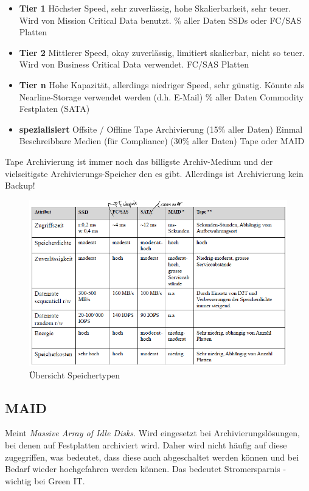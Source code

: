 \begin{itemize}
	\item \textbf{Tier 1}
		\subitem Höchster Speed, sehr zuverlässig, hohe Skalierbarkeit, sehr teuer. Wird von Mission Critical Data benutzt.
		\% aller Daten 
		\subitem SSDs oder FC/SAS Platten
	\item \textbf{Tier 2}
		\subitem Mittlerer Speed, okay zuverlässig, limitiert skalierbar, nicht so teuer. Wird von Business Critical Data verwendet.
		\subitem FC/SAS Platten
	\item \textbf{Tier n}
		\subitem Hohe Kapazität, allerdings niedriger Speed, sehr günstig. Könnte als Nearline-Storage verwendet werden (d.h. E-Mail)
		\% aller Daten
		\subitem Commodity Festplaten (SATA)
	\item \textbf{spezialisiert}
		\subitem Offsite / Offline Tape Archivierung (15\% aller Daten)
		\subitem Einmal Beschreibbare Medien (für Compliance) (30\% aller Daten)
		\subitem Tape oder MAID
\end{itemize}
Tape Archivierung ist immer noch das billigste Archiv-Medium und der vielseitigste Archivierungs-Speicher den es gibt. Allerdings ist Archivierung kein Backup!

\begin{figure}[h!]
	\centering
	\includegraphics[width=0.9\linewidth]{fig/speichertypen}
	\caption{Übersicht Speichertypen}
	\label{fig:speichertypen}
\end{figure}

\subsection{MAID}\label{sec:maid}
Meint \emph{Massive Array of Idle Disks}. Wird eingesetzt bei Archivierungslösungen, bei denen auf Festplatten archiviert wird. Daher wird nicht häufig auf diese zugegriffen, was bedeutet, dass diese auch abgeschaltet werden können und bei Bedarf wieder hochgefahren werden können. Das bedeutet Stromersparnis - wichtig bei Green IT.

